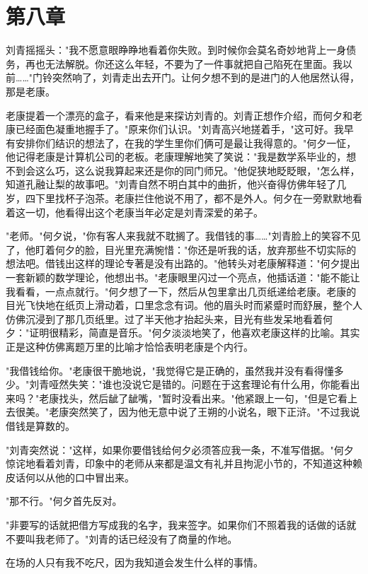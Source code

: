 \documentclass[UTF8]{ctexart}
\begin{document}
\section*{第八章}

刘青摇摇头："我不愿意眼睁睁地看着你失败。到时候你会莫名奇妙地背上一身债务，再也无法解脱。你还这么年轻，不要为了一件事就把自己陷死在里面。我以前……"门铃突然响了，刘青走出去开门。让何夕想不到的是进门的人他居然认得，那是老康。

老康提着一个漂亮的盒子，看来他是来探访刘青的。刘青正想作介绍，而何夕和老康已经面色凝重地握手了。"原来你们认识。"刘青高兴地搓着手，"这可好。我早有安排你们结识的想法了，在我的学生里你们俩可是最让我得意的。"何夕一怔，他记得老康是计算机公司的老板。老康理解地笑了笑说："我是数学系毕业的，想不到会这么巧，这么说我算起来还是你的同门师兄。"他促狭地眨眨眼，"怎么样，知道孔融让梨的故事吧。"刘青自然不明白其中的曲折，他兴奋得仿佛年轻了几岁，四下里找杯子泡茶。老康拦住他说不用了，都不是外人。何夕在一旁默默地看着这一切，他看得出这个老康当年必定是刘青深爱的弟子。

"老师。"何夕说，"你有客人来我就不耽搁了。我借钱的事……"刘青脸上的笑容不见了，他盯着何夕的脸，目光里充满惋惜："你还是听我的话，放弃那些不切实际的想法吧。借钱出这样的理论专著是没有出路的。"他转头对老康解释道："何夕提出一套新颖的数学理论，他想出书。"老康眼里闪过一个亮点，他插话道："能不能让我看看，一点点就行。"何夕想了一下，然后从包里拿出几页纸递给老康。老康的目光飞快地在纸页上滑动着，口里念念有词。他的眉头时而紧蹙时而舒展，整个人仿佛沉浸到了那几页纸里。过了半天他才抬起头来，目光有些发呆地看着何夕："证明很精彩，简直是音乐。"何夕淡淡地笑了，他喜欢老康这样的比喻。其实正是这种仿佛离题万里的比喻才恰恰表明老康是个内行。

"我借钱给你。"老康很干脆地说，"我觉得它是正确的，虽然我并没有看得懂多少。"刘青哑然失笑："谁也没说它是错的。问题在于这套理论有什么用，你能看出来吗？"老康找头，然后龇了龇嘴，"暂时没看出来。"他紧跟上一句，"但是它看上去很美。"老康突然笑了，因为他无意中说了王朔的小说名，眼下正浒。"不过我说借钱是算数的。

"刘青突然说："这样，如果你要借钱给何夕必须答应我一条，不准写借据。"何夕惊诧地看着刘青，印象中的老师从来都是温文有礼并且拘泥小节的，不知道这种赖皮话何以从他的口中冒出来。

"那不行。"何夕首先反对。

"非要写的话就把借方写成我的名字，我来签字。如果你们不照着我的话做的话就不要叫我老师了。"刘青的话已经没有了商量的作地。

在场的人只有我不吃尺，因为我知道会发生什么样的事情。
\end{document}
